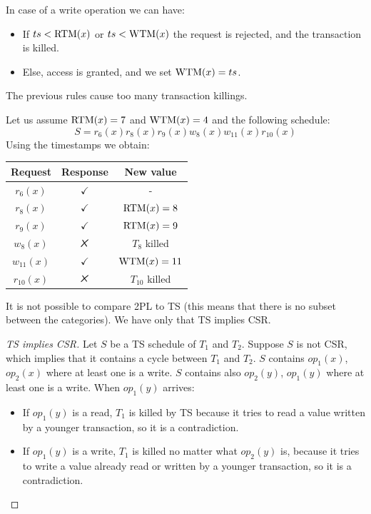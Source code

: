 In case of a write operation we can have: 
\begin{itemize}
    \item If $ts<\textnormal{RTM}(x)$ or $ts<\textnormal{WTM}(x)$ the request is rejected, and the  transaction is killed. 
    \item Else, access is granted, and we set $\textnormal{WTM}(x)=ts$. 
\end{itemize}
The previous rules cause too many transaction killings. 
\begin{example}
    Let us assume $\textnormal{RTM}(x)=7$ and $\textnormal{WTM}(x)=4$ and the following schedule: 
    \[S=r_6(x) r_8(x) r_9(x) w_8(x) w_{11}(x) r_{10}(x)\]
    Using the timestamps we obtain: 
    \begin{table}[H]
        \centering
        \begin{tabular}{ccc}
        \textbf{Request} & \textbf{Response} & \textbf{New value} \\ \hline
        $r_6(x)$         & $\checkmark$      & -                  \\
        $r_8(x)$         & $\checkmark$      & $\textnormal{RTM}(x)=8$         \\
        $r_9(x)$         & $\checkmark$      & $\textnormal{RTM}(x)=9$         \\
        $w_8(x)$         & $\tikzxmark$      & $T_8$ killed       \\
        $w_{11}(x)$      & $\checkmark$      & $\textnormal{WTM}(x)=11$        \\
        $r_{10}(x)$      & $\tikzxmark$      & $T_{10}$ killed   
        \end{tabular}
    \end{table}
\end{example}
It is not possible to compare 2PL to TS (this means that there is no subset between the categories). We have only that TS implies CSR. 
\begin{proof}[TS implies CSR]
    Let $S$ be a TS schedule of $T_1$ and $T_2$. Suppose $S$ is not CSR, which implies that it contains a cycle between $T_1$ and $T_2$. $S$ contains $op_1(x)$, $op_2(x)$ where at 
    least one is a write. $S$ contains also $op_2(y)$, $op_1(y)$ where at least one is a write. 
    When $op_1(y)$ arrives:
    \begin{itemize}
        \item If $op_1(y)$ is a read, $T_1$ is killed by TS because it tries to read a value written by a younger transaction, so it is a contradiction. 
        \item If $op_1(y)$ is a write, $T_1$ is killed no matter what $op_2(y)$ is, because it tries to write a value already read or written by a younger transaction, so it is a 
            contradiction. 
    \end{itemize}
\end{proof}
